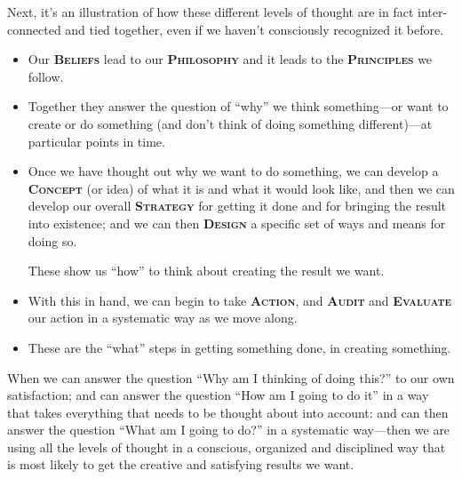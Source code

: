 \documentclass[a5paper]{article}
\begin{document}
Next, it's an illustration of how these different levels of thought are in fact inter-connected and tied together, even if we haven't consciously recognized it before.
\begin{itemize}
  \item Our \textbf{\scshape Beliefs} lead to our \textbf{\scshape Philosophy} and it leads to the \textbf{\scshape Principles} we follow.
  \item Together they answer the question of ``why'' we think something---or want to create or do something (and don't think of doing something
different)---at particular points in time.
  \item Once we have thought out why we want to do something, we can develop a \textbf{\scshape Concept} (or idea) of what it is and what it would look like, and then we can develop our overall \textbf{\scshape Strategy} for getting it done and for bringing the result into existence; and we can then \textbf{\scshape Design} a specific set of ways and means for doing so.

    These show us ``how'' to think about creating the result we want.
  \item With this in hand, we can begin to take \textbf{\scshape Action}, and \textbf{\scshape Audit} and \textbf{\scshape Evaluate} our action in a systematic way as we move along.
  \item These are the ``what'' steps in getting something done, in creating something.
\end{itemize}
\begin{figure}[h]
\centering
{}
\end{figure}

When we can answer the question ``Why am I thinking of doing this?'' to our own satisfaction; and can answer the question ``How am I going to do it'' in a way that takes everything that needs to be thought about into account: and can then answer the question ``What am I going to do?'' in a systematic way---then we are using all the levels of thought in a conscious, organized and disciplined way that is most likely to get the creative and satisfying results we want.
\end{document}
